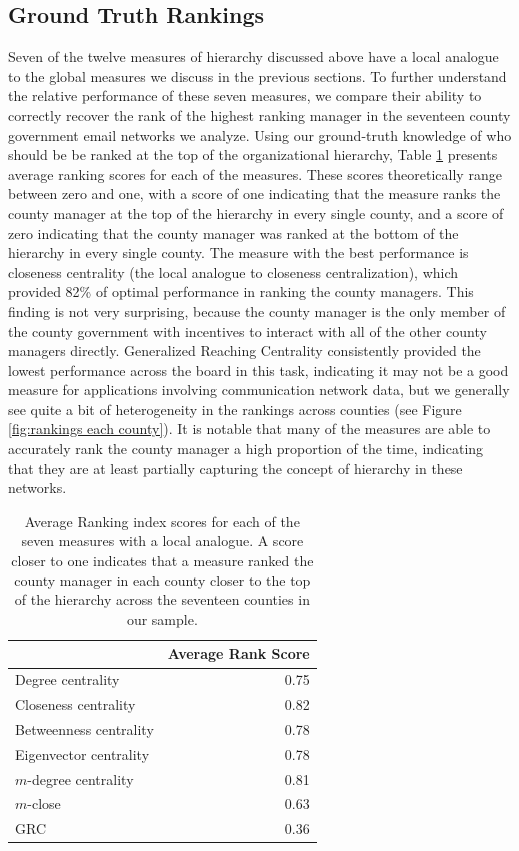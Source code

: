 \documentclass[3p,times]{elsarticle}
\begin{document}

\subsection{Ground Truth Rankings}

Seven of the twelve measures of hierarchy discussed above have a local analogue to the global measures we discuss in the previous sections.  To further understand the relative performance of these seven measures, we compare their ability to correctly recover the rank of the highest ranking manager in the seventeen county government email networks we analyze. Using our ground-truth knowledge of who should be be ranked at the top of the organizational hierarchy, Table \ref{tab:average local rankings} presents average ranking scores for each of the measures. These scores theoretically range between zero and one, with a score of one indicating that the measure ranks the county manager at the top of the hierarchy in every single county, and a score of zero indicating that the county manager was ranked at the bottom of the hierarchy in every single county. The measure with the best performance is closeness centrality (the local analogue to closeness centralization), which provided 82\% of optimal performance in ranking the county managers. This finding is not very surprising, because the county manager is the only member of the county government with incentives to interact with all of the other county managers directly. Generalized Reaching Centrality consistently provided the lowest performance across the board in this task, indicating it may not be a good measure for applications involving communication network data, but we generally see quite a bit of heterogeneity in the rankings across counties (see Figure \ref{fig:rankings each county}).  It is notable that many of the measures are able to accurately rank the county manager a high proportion of the time, indicating that they are at least partially capturing the concept of hierarchy in these networks. 

\begin{table}
\centering
\caption{\label{tab:average local rankings} Average Ranking index scores for each of the seven measures with a local analogue. A score closer to one indicates that a measure ranked the county manager in each county closer to the top of the hierarchy across the seventeen counties in our sample.}
\begin{tabular}{lr}
  \toprule
 & Average Rank Score \\ 
  \midrule
Degree centrality & 0.75 \\ 
  Closeness centrality & 0.82 \\ 
  Betweenness centrality & 0.78 \\ 
  Eigenvector centrality & 0.78 \\ 
  $m$-degree centrality& 0.81 \\ 
  $m$-close & 0.63 \\ 
  GRC & 0.36 \\ 
   \bottomrule
\end{tabular}
\end{table}
\end{document}
